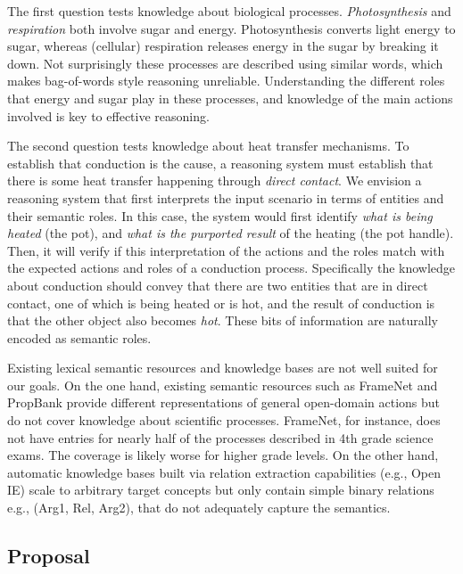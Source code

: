 The first question tests knowledge about biological processes.
{\em Photosynthesis} and {\em respiration} both involve sugar and energy. 
Photosynthesis converts light energy to sugar, whereas (cellular) respiration releases energy in the sugar by breaking it down. 
Not surprisingly these processes are described using similar words, which makes bag-of-words style reasoning unreliable. 
Understanding the different roles that energy and sugar play in these processes, and knowledge of the main actions involved is key to effective reasoning.

The second question tests knowledge about heat transfer mechanisms.
To establish that conduction is the cause, a reasoning system must establish that there is some heat transfer happening through {\em direct contact}. 
We envision a reasoning system that first interprets the input scenario in terms of entities and their semantic roles. 
In this case, the system would first identify {\em what is being heated} (the pot), and {\em what is the purported result} of the heating (the pot handle). 
Then, it will verify if this interpretation of the actions and the roles match with the expected actions and roles of a conduction process. 
Specifically the knowledge about conduction should convey that there are two entities that are in direct contact, one of which is being heated or is hot, 
and the result of conduction is that the other object also becomes {\em hot}. 
These bits of information are naturally encoded as semantic roles.

Existing lexical semantic resources and knowledge bases are not well suited for our goals.
On the one hand, existing semantic resources such as FrameNet and PropBank provide different representations of 
general open-domain actions but do not cover knowledge about scientific processes. 
FrameNet, for instance, does not have entries for nearly half of the processes described in 4th grade science exams. 
The coverage is likely worse for higher grade levels. On the other hand, automatic knowledge bases built via relation extraction
capabilities (e.g., Open IE) scale to arbitrary target concepts but only contain simple binary relations e.g., (Arg1, Rel, Arg2), that do not adequately capture the semantics.


\subsection{Proposal}

